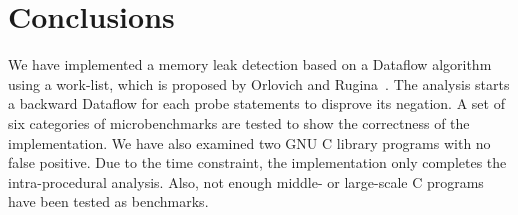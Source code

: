 \section{Conclusions}

We have implemented a memory leak detection based on a Dataflow algorithm using 
a work-list, which is proposed by Orlovich and Rugina~\cite{rugina}. The analysis 
starts a backward Dataflow for each probe statements to disprove its negation. 
A set of six categories of microbenchmarks are tested to show the correctness 
of the implementation. We have also examined two GNU C library programs with no 
false positive. Due to the time constraint, the implementation only completes 
the intra-procedural analysis. Also, not enough middle- or large-scale C 
programs have been tested as benchmarks.
